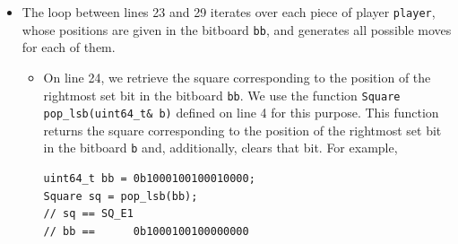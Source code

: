 \documentclass[12pt,a4paper,twoside,openright]{book}
\begin{document}
\begin{itemize}
\item The loop between lines 23 and 29 iterates over each piece of player \texttt{player}, whose positions are given in the bitboard \texttt{bb}, and generates all possible moves for each of them.
\begin{itemize}
\item On line 24, we retrieve the square corresponding to the position of the rightmost set bit in the bitboard \texttt{bb}. We use the function \texttt{Square pop_lsb(uint64_t& b)} defined on line 4 for this purpose. This function returns the square corresponding to the position of the rightmost set bit in the bitboard \texttt{b} and, additionally, clears that bit. For example,
\begin{verbatim}
uint64_t bb = 0b1000100100010000;
Square sq = pop_lsb(bb);
// sq == SQ_E1
// bb ==      0b1000100100000000
\end{verbatim}


\end{itemize}
\end{itemize}
\end{document}
